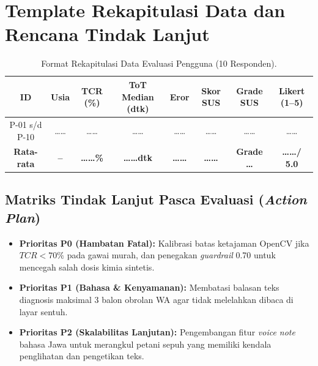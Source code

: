 \documentclass[11pt,a4paper]{article}
\begin{document}
\section{Template Rekapitulasi Data dan Rencana Tindak Lanjut}

\begin{table}[htbp]
\centering
\small
\caption{Format Rekapitulasi Data Evaluasi Pengguna (10 Responden).}
\label{tab:rekap_data}
\begin{tabularx}{\textwidth}{c c c c c c c c}
\toprule
\textbf{ID} & \textbf{Usia} & \textbf{TCR (\%)} & \textbf{ToT Median (dtk)} & \textbf{Eror} & \textbf{Skor SUS} & \textbf{Grade SUS} & \textbf{Likert (1--5)} \\
\midrule
P-01 s/d P-10 & \dots\dots & \dots\dots & \dots\dots & \dots\dots & \dots\dots & \dots\dots & \dots\dots \\
\midrule
\textbf{Rata-rata} & \textbf{--} & \textbf{\dots\dots\%} & \textbf{\dots\dots dtk} & \textbf{\dots\dots} & \textbf{\dots\dots} & \textbf{Grade \dots} & \textbf{\dots\dots / 5.0} \\
\bottomrule
\end{tabularx}
\end{table}

\subsection{Matriks Tindak Lanjut Pasca Evaluasi (\textit{Action Plan})}
\begin{itemize}[noitemsep]
    \item \textbf{Prioritas P0 (Hambatan Fatal):} Kalibrasi batas ketajaman OpenCV jika $TCR < 70\%$ pada gawai murah, dan penegakan \textit{guardrail} 0.70 untuk mencegah salah dosis kimia sintetis.
    \item \textbf{Prioritas P1 (Bahasa \& Kenyamanan):} Membatasi balasan teks diagnosis maksimal 3 balon obrolan WA agar tidak melelahkan dibaca di layar sentuh.
    \item \textbf{Prioritas P2 (Skalabilitas Lanjutan):} Pengembangan fitur \textit{voice note} bahasa Jawa untuk merangkul petani sepuh yang memiliki kendala penglihatan dan pengetikan teks.
\end{itemize}
\end{document}
